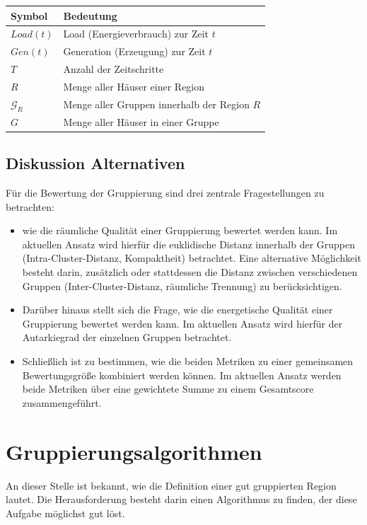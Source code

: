 \begin{tabular}{ll}
\textbf{Symbol} & \textbf{Bedeutung} \\ \hline
$Load(t)$ & Load (Energieverbrauch) zur Zeit $t$ \\ 
$Gen(t)$ & Generation (Erzeugung) zur Zeit $t$ \\ 
$T$ & Anzahl der Zeitschritte \\ 
$R$ & Menge aller Häuser einer Region \\ 
$\mathcal{G}_R$ & Menge aller Gruppen innerhalb der Region $R$ \\
$G$ & Menge aller Häuser in einer Gruppe \\ 
\end{tabular}

\subsection{Diskussion Alternativen}

Für die Bewertung der Gruppierung sind drei zentrale Fragestellungen zu betrachten:
\begin{itemize}
    \item wie die räumliche Qualität einer Gruppierung bewertet werden kann. \newline Im aktuellen Ansatz wird hierfür die euklidische Distanz innerhalb der Gruppen (Intra-Cluster-Distanz, Kompaktheit) betrachtet. Eine alternative Möglichkeit besteht darin, zusätzlich oder stattdessen die Distanz zwischen verschiedenen Gruppen (Inter-Cluster-Distanz, räumliche Trennung) zu berücksichtigen.
    \item Darüber hinaus stellt sich die Frage, wie die energetische Qualität einer Gruppierung bewertet werden kann. Im aktuellen Ansatz wird hierfür der Autarkiegrad der einzelnen Gruppen betrachtet. 
    \item Schließlich ist zu bestimmen, wie die beiden Metriken zu einer gemeinsamen Bewertungsgröße kombiniert werden können. Im aktuellen Ansatz werden beide Metriken über eine gewichtete Summe zu einem Gesamtscore zusammengeführt.
\end{itemize}


\section{Gruppierungsalgorithmen}
An dieser Stelle ist bekannt, wie die Definition einer gut gruppierten Region lautet. Die Herausforderung besteht darin einen Algorithmus zu finden, der diese Aufgabe möglichst gut löst.

